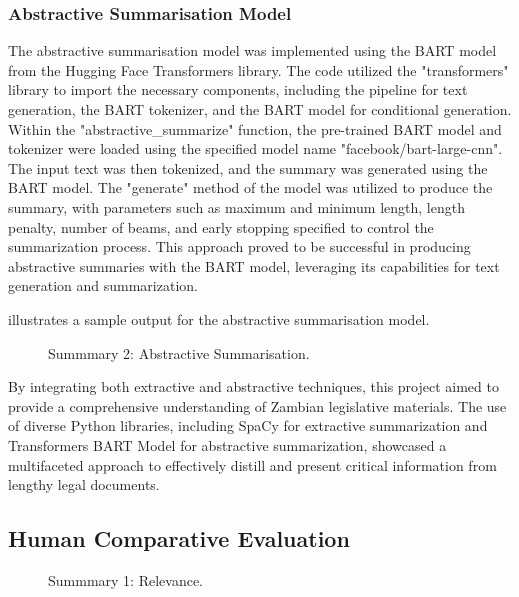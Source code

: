 \documentclass[conference]{IEEEtran}
\begin{document}
\subsubsection{Abstractive Summarisation Model}
\label{sec:results_and_discussion:automatic_summarisation:abstractive}

The abstractive summarisation model was implemented using the BART model from the Hugging Face Transformers library. The
code utilized the "transformers" library to import the necessary components, including the pipeline for text generation, the BART tokenizer, and the BART model for conditional generation. Within the "abstractive\_summarize" function, the pre-trained BART model and tokenizer were loaded using the specified model name "facebook/bart-large-cnn". The input text was then tokenized, and the summary was generated using the BART model. The "generate" method of the model was utilized to produce the summary, with parameters such as maximum and minimum length, length penalty, number of beams, and early stopping specified to control the summarization process. This approach proved to be successful in producing abstractive summaries with the BART model, leveraging its capabilities for text generation and summarization.

 illustrates a sample output for the abstractive summarisation model.

\begin{figure}%
%
\caption{Summmary 2: Abstractive Summarisation.}
\label{fig:results_and_discussion:summarisation_models:summary2}
\end{figure}

By integrating both extractive and abstractive techniques, this project aimed to provide a comprehensive understanding of Zambian legislative materials. The use of diverse Python libraries, including SpaCy for extractive summarization and Transformers BART Model for abstractive summarization, showcased a multifaceted approach to effectively distill and present critical information from lengthy legal documents.


\subsection{Human Comparative Evaluation}
\label{sec:results_and_discussion:human_evaluation}

\begin{figure}%
%
\caption{Summmary 1: Relevance.}
\label{fig:results_and_discussion:summarisation_models:summary1_relevance}
\end{figure}
\end{document}
